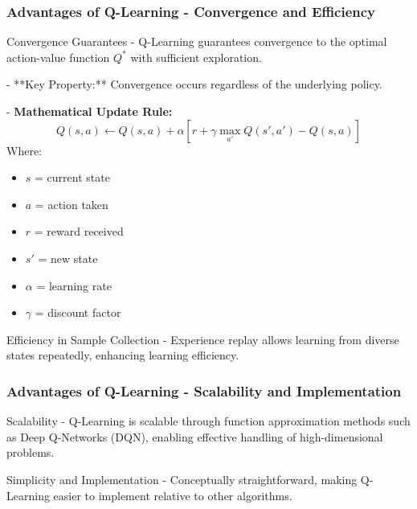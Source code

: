 \documentclass[aspectratio=169]{beamer}
\begin{document}
\begin{frame}[fragile]
    \frametitle{Advantages of Q-Learning - Convergence and Efficiency}
    \begin{block}{Convergence Guarantees}
        - Q-Learning guarantees convergence to the optimal action-value function \( Q^* \) with sufficient exploration.
        
        - **Key Property:** Convergence occurs regardless of the underlying policy.
        
        - \textbf{Mathematical Update Rule:}
        \begin{equation}
            Q(s, a) \leftarrow Q(s, a) + \alpha \left[ r + \gamma \max_{a'} Q(s', a') - Q(s, a) \right]
        \end{equation}
        Where:
        \begin{itemize}
            \item \( s \) = current state
            \item \( a \) = action taken
            \item \( r \) = reward received
            \item \( s' \) = new state
            \item \( \alpha \) = learning rate
            \item \( \gamma \) = discount factor
        \end{itemize}
    \end{block}

    \begin{block}{Efficiency in Sample Collection}
        - Experience replay allows learning from diverse states repeatedly, enhancing learning efficiency.
    \end{block}
\end{frame}

\begin{frame}[fragile]
    \frametitle{Advantages of Q-Learning - Scalability and Implementation}
    \begin{block}{Scalability}
        - Q-Learning is scalable through function approximation methods such as Deep Q-Networks (DQN), enabling effective handling of high-dimensional problems.
    \end{block}

    \begin{block}{Simplicity and Implementation}
        - Conceptually straightforward, making Q-Learning easier to implement relative to other algorithms.
    \end{block}
\end{frame}
\end{document}
